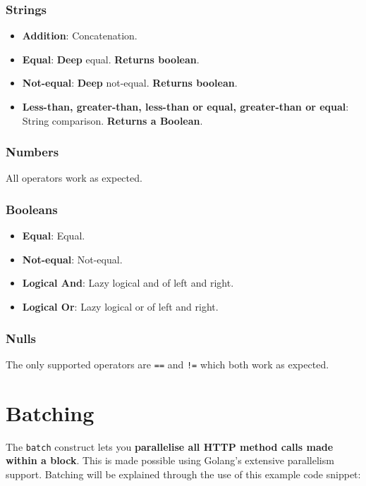 \documentclass[12pt, letterpaper]{article}
\begin{document}
\subsubsection{Strings}

\begin{itemize}
    \item \textbf{Addition}: Concatenation.
    \item \textbf{Equal}: \textbf{Deep} equal. \textbf{Returns boolean}.
    \item \textbf{Not-equal}: \textbf{Deep} not-equal. \textbf{Returns boolean}.
    \item \textbf{Less-than, greater-than, less-than or equal, greater-than or equal}: String comparison. \textbf{Returns a Boolean}.
\end{itemize}

\subsubsection{Numbers}

All operators work as expected.

\subsubsection{Booleans}

\begin{itemize}
    \item \textbf{Equal}: Equal.
    \item \textbf{Not-equal}: Not-equal.
    \item \textbf{Logical And}: Lazy logical and of left and right.
    \item \textbf{Logical Or}: Lazy logical or of left and right.
\end{itemize}

\subsubsection{Nulls}

The only supported operators are \verb|==| and \verb|!=| which both work as expected.

\section{Batching}

The \verb|batch| construct lets you \textbf{parallelise all HTTP method calls made within a block}. This is made possible using Golang's extensive parallelism support. Batching will be explained through the use of this example code snippet:
\end{document}
